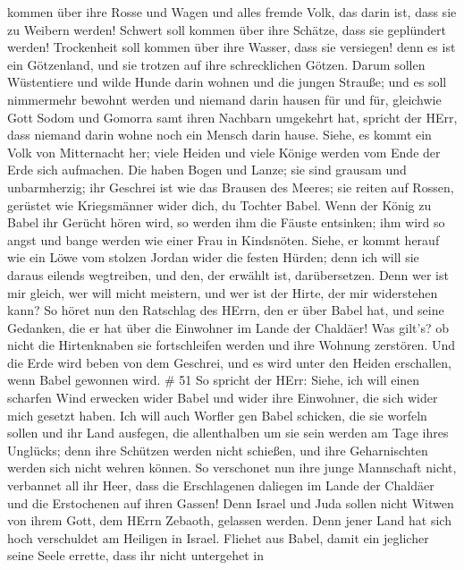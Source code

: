 kommen über ihre Rosse und Wagen und alles fremde Volk, das darin ist,
dass sie zu Weibern werden! Schwert soll kommen über ihre Schätze, dass
sie geplündert werden!  Trockenheit soll kommen über ihre
Wasser, dass sie versiegen! denn es ist ein Götzenland, und sie trotzen
auf ihre schrecklichen Götzen.  Darum sollen Wüstentiere
und wilde Hunde darin wohnen und die jungen Strauße; und es soll
nimmermehr bewohnt werden und niemand darin hausen für und für,
 gleichwie Gott Sodom und Gomorra samt ihren Nachbarn
umgekehrt hat, spricht der HErr, dass niemand darin wohne noch ein
Mensch darin hause.  Siehe, es kommt ein Volk von
Mitternacht her; viele Heiden und viele Könige werden vom Ende der Erde
sich aufmachen.  Die haben Bogen und Lanze; sie sind
grausam und unbarmherzig; ihr Geschrei ist wie das Brausen des Meeres;
sie reiten auf Rossen, gerüstet wie Kriegsmänner wider dich, du Tochter
Babel.  Wenn der König zu Babel ihr Gerücht hören wird, so
werden ihm die Fäuste entsinken; ihm wird so angst und bange werden wie
einer Frau in Kindsnöten.  Siehe, er kommt herauf wie ein
Löwe vom stolzen Jordan wider die festen Hürden; denn ich will sie
daraus eilends wegtreiben, und den, der erwählt ist, darübersetzen. Denn
wer ist mir gleich, wer will micht meistern, und wer ist der Hirte, der
mir widerstehen kann?  So höret nun den Ratschlag des
HErrn, den er über Babel hat, und seine Gedanken, die er hat über die
Einwohner im Lande der Chaldäer! Was gilt's? ob nicht die Hirtenknaben
sie fortschleifen werden und ihre Wohnung zerstören.  Und
die Erde wird beben von dem Geschrei, und es wird unter den Heiden
erschallen, wenn Babel gewonnen wird. \# 51  So spricht der
HErr: Siehe, ich will einen scharfen Wind erwecken wider Babel und wider
ihre Einwohner, die sich wider mich gesetzt haben.  Ich will
auch Worfler gen Babel schicken, die sie worfeln sollen und ihr Land
ausfegen, die allenthalben um sie sein werden am Tage ihres Unglücks;
 denn ihre Schützen werden nicht schießen, und ihre
Geharnischten werden sich nicht wehren können. So verschonet nun ihre
junge Mannschaft nicht, verbannet all ihr Heer,  dass die
Erschlagenen daliegen im Lande der Chaldäer und die Erstochenen auf
ihren Gassen!  Denn Israel und Juda sollen nicht Witwen von
ihrem Gott, dem HErrn Zebaoth, gelassen werden. Denn jener Land hat sich
hoch verschuldet am Heiligen in Israel.  Fliehet aus Babel,
damit ein jeglicher seine Seele errette, dass ihr nicht untergehet in
